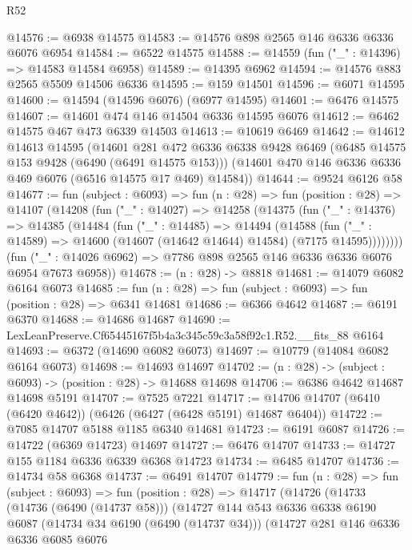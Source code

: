 \begin{lexlean}{R52}
\begin{coremodule}
@14576 := @6938 @14575
@14583 := @14576 @898 @2565 @146 @6336 @6336 @6076 @6954
@14584 := @6522 @14575
@14588 := @14559 (fun ("_" : @14396) => @14583 @14584 @6958)
@14589 := @14395 @6962
@14594 := @14576 @883 @2565 @5509 @14506 @6336
@14595 := @159 @14501
@14596 := @6071 @14595
@14600 := @14594 (@14596 @6076) (@6977 @14595)
@14601 := @6476 @14575
@14607 := @14601 @474 @146 @14504 @6336 @14595 @6076
@14612 := @6462 @14575 @467 @473 @6339 @14503
@14613 := @10619 @6469
@14642 := @14612
    @14613
    @14595
    (@14601
      @281
      @472
      @6336
      @6338
      @9428
      @6469
      (@6485 @14575 @153 @9428 (@6490 (@6491 @14575 @153)))
      (@14601 @470 @146 @6336 @6336 @469 @6076 (@6516 @14575 @17 @469) @14584))
@14644 := @9524 @6126 @58
@14677 := fun (subject : @6093) =>
  fun (n : @28) =>
  fun (position : @28) =>
  @14107
    (@14208
      (fun ("_" : @14027) =>
      @14258
        (@14375
          (fun ("_" : @14376) =>
          @14385
            (@14484
              (fun ("_" : @14485) =>
              @14494
                (@14588
                  (fun ("_" : @14589) =>
                  @14600 (@14607 (@14642 @14644) @14584) (@7175 @14595))))))))
      (fun ("_" : @14026 @6962) => @7786 @898 @2565 @146 @6336 @6336 @6076 @6954 @7673 @6958))
@14678 := (n : @28) -> @8818
@14681 := @14079 @6082 @6164 @6073
@14685 := fun (n : @28) => fun (subject : @6093) => fun (position : @28) => @6341 @14681
@14686 := @6366 @4642
@14687 := @6191 @6370
@14688 := @14686 @14687
@14690 := LexLeanPreserve.Cf65445167f5b4a3c345c59c3a58f92c1.R52.__fits_88 @6164
@14693 := @6372 (@14690 @6082 @6073)
@14697 := @10779 (@14084 @6082 @6164 @6073)
@14698 := @14693 @14697
@14702 := (n : @28) -> (subject : @6093) -> (position : @28) -> @14688 @14698
@14706 := @6386 @4642 @14687 @14698 @5191
@14707 := @7525 @7221
@14717 := @14706 @14707 (@6410 (@6420 @4642)) (@6426 (@6427 (@6428 @5191) @14687 @6404))
@14722 := @7085 @14707 @5188 @1185 @6340 @14681
@14723 := @6191 @6087
@14726 := @14722 (@6369 @14723) @14697
@14727 := @6476 @14707
@14733 := @14727 @155 @1184 @6336 @6339 @6368 @14723
@14734 := @6485 @14707
@14736 := @14734 @58 @6368
@14737 := @6491 @14707
@14779 := fun (n : @28) =>
  fun (subject : @6093) =>
  fun (position : @28) =>
  @14717
    (@14726
      (@14733
        (@14736 (@6490 (@14737 @58)))
        (@14727
          @144
          @543
          @6336
          @6338
          @6190
          @6087
          (@14734 @34 @6190 (@6490 (@14737 @34)))
          (@14727
            @281
            @146
            @6336
            @6336
            @6085
            @6076

\end{coremodule}
\end{lexlean}

